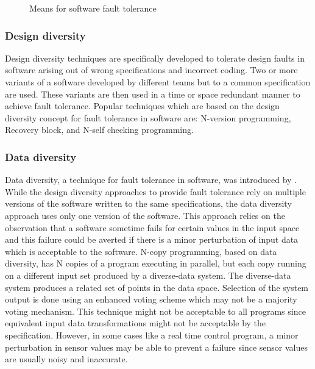 \documentclass[a4paper, 11pt]{article}
\begin{document}
\begin{figure}[htbp]
\hspace*{2cm}
\caption{Means for software fault tolerance}
\label{fig:faulttoltree}
\end{figure}

\subsubsection{Design diversity}
Design diversity techniques are specifically developed to tolerate design faults in software arising out of wrong specifications and incorrect coding. Two or more variants of a software developed by different teams but to a common specification are used. These variants are then used in a time or space redundant manner to achieve fault tolerance. Popular techniques which are based on the design diversity concept for fault tolerance in software are: N-version programming, Recovery block, and N-self checking programming.

\subsubsection{Data diversity}
Data diversity, a technique for fault tolerance in software, was introduced by \citet{ammann1988data}. While the design diversity approaches to provide fault tolerance rely on multiple versions of the software written to the same specifications, the data diversity approach uses only one version of the software. This approach relies on the observation that a software sometime fails for certain values in the input space and this failure could be averted if there is a minor perturbation of input data which is acceptable to the software. N-copy programming, based on data diversity, has N copies of a program executing in parallel, but each copy running on a different input set produced by a diverse-data system. The diverse-data system produces a related set of points in the data space. Selection of the system output is done using an enhanced voting scheme which may not be a majority voting mechanism. This technique might not be acceptable to all programs since equivalent input data transformations might not be acceptable by the specification. However, in some cases like a real time control program, a minor perturbation in sensor values may be able to prevent a failure since sensor values are usually noisy and inaccurate.
\end{document}
